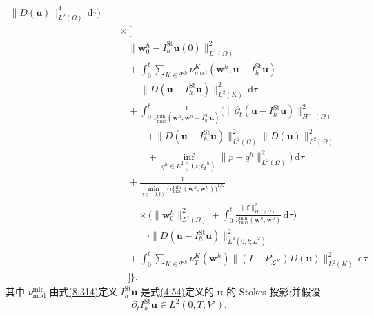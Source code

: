 \begin{theorem}[修正黏度依赖的速度误差估计]
\begin{equation}
\begin{aligned}
   \|D(\bm u)\|_{L^2(\Omega)}^4\,\mathrm d\tau\Biggr)\\
 &\quad\times\Biggl[\\
 &\qquad\|\bm w_0^h-I_h^{\mathrm{St}}\bm u(0)\|_{L^2(\Omega)}^2\\
 &\qquad+\int_0^t\sum_{K\in\mathcal T^h}
   \nu_{\mathrm{mod}}^K(\bm w^h,\bm u-I_h^{\mathrm{St}}\bm u)\\
 &\qquad\quad\cdot\|D(\bm u-I_h^{\mathrm{St}}\bm u)\|_{L^2(K)}^2\,\mathrm d\tau\\
 &\qquad+\int_0^t\frac{1}{\nu_{\mathrm{mod}}^{\min}(\bm w^h,
       \bm w^h-I_h^{\mathrm{St}}\bm u)}
   \Biggl(\|\partial_t(\bm u-I_h^{\mathrm{St}}\bm u)\|_{H^{-1}(\Omega)}^2\\
 &\qquad\qquad+\|D(\bm u-I_h^{\mathrm{St}}\bm u)\|_{L^2(\Omega)}^2
       \|D(\bm u)\|_{L^2(\Omega)}^2\\
 &\qquad\qquad+\inf_{q^h\in L^2(0,t;Q^h)}
          \|p-q^h\|_{L^2(\Omega)}^2\Biggr)\,\mathrm d\tau\\
 &\qquad+\frac{1}{\displaystyle\min_{\tau\in(0,t)}
       \bigl(\nu_{\mathrm{mod}}^{\min}(\bm w^h,\bm w^h)\bigr)^{1/2}}\\
 &\qquad\quad\times\Biggl(\|\bm w_0^h\|_{L^2(\Omega)}^2
       +\int_0^t\frac{\|\bm f\|_{H^{-1}(\Omega)}^2}
         {\nu_{\mathrm{mod}}^{\min}(\bm w^h,\bm w^h)}\,\mathrm d\tau\Biggr)\\
 &\qquad\qquad\cdot\|D(\bm u-I_h^{\mathrm{St}}\bm u)\|_{L^4(0,t;L^2)}^2\\
 &\qquad+\int_0^t\sum_{K\in\mathcal T^h}
      \nu_T^K(\bm w^h)
      \|(I-P_{\mathcal L^H})D(\bm u)\|_{L^2(K)}^2\,\mathrm d\tau\\
 &\qquad\Biggr]\Biggr\}.
\end{aligned}
\end{equation}
其中 $\nu_{\mathrm{mod}}^{\min}$ 由式\hyperref[eq:vms-coarse-projection-min-modified-viscosity]{(8.314)}定义,$I_h^{\mathrm{St}}\bm u$ 是式\hyperref[eq:stokes-projection-definition]{(4.54)}定义的 $\bm u$ 的 Stokes 投影;并假设
\begin{equation}\label{eq:vms-coarse-projection-stokes-time-regularity}
 \partial_t I_h^{\mathrm{St}}\bm u\in L^2(0,T;V').
\end{equation}
\end{theorem}

